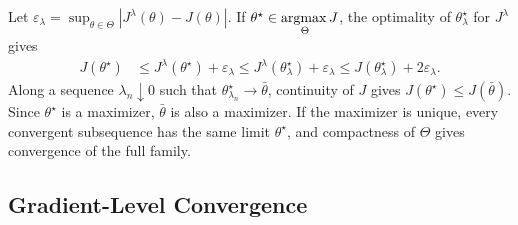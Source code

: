 Let $\varepsilon_\lambda=\sup_{\theta\in\Theta}|J^\lambda(\theta)-J(\theta)|$. If $\theta^\star\in\argmax_\Theta J$, the optimality of $\theta_\lambda^\star$ for $J^\lambda$ gives
\begin{align}
    J(\theta^\star)
    &\leq
    J^\lambda(\theta^\star)+\varepsilon_\lambda
    \leq
    J^\lambda(\theta_\lambda^\star)+\varepsilon_\lambda
    \leq
    J(\theta_\lambda^\star)+2\varepsilon_\lambda.
\end{align}
Along a sequence $\lambda_n\downarrow0$ such that $\theta_{\lambda_n}^\star\to\bar\theta$, continuity of $J$ gives $J(\theta^\star)\leq J(\bar\theta)$. Since $\theta^\star$ is a maximizer, $\bar\theta$ is also a maximizer. If the maximizer is unique, every convergent subsequence has the same limit $\theta^\star$, and compactness of $\Theta$ gives convergence of the full family.

\subsection{Gradient-Level Convergence}
\label{appendix:gradient-convergence-proofs}

